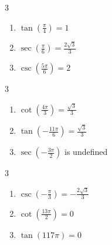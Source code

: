 \documentclass{ximera}
\begin{document}
	\author{Stitz-Zeager}


\begin{multicols}{3}

\begin{enumerate}

\item $\tan \left( \frac{\pi}{4} \right) = 1$ 
\item $\sec \left( \frac{\pi}{6} \right) = \frac{2\sqrt{3}}{3}$
\item $\csc \left( \frac{5\pi}{6} \right) = 2$ 

\setcounter{HW}{\value{enumi}}

\end{enumerate}

\end{multicols}

\begin{multicols}{3}

\begin{enumerate}

\setcounter{enumi}{\value{HW}}

\item $\cot \left( \frac{4\pi}{3} \right) = \frac{\sqrt{3}}{3}$
\item $\tan \left( -\frac{11\pi}{6} \right) = \frac{\sqrt{3}}{3}$
\item $\sec \left( -\frac{3\pi}{2} \right)$ is undefined 

\setcounter{HW}{\value{enumi}}

\end{enumerate}

\end{multicols}

\begin{multicols}{3}

\begin{enumerate}

\setcounter{enumi}{\value{HW}}

\item $\csc \left( -\frac{\pi}{3} \right) = -\frac{2\sqrt{3}}{3}$
\item $\cot \left( \frac{13\pi}{2} \right) = 0$
\item $\tan \left( 117\pi \right) = 0$ 

\setcounter{HW}{\value{enumi}}

\end{enumerate}

\end{multicols}
\end{document}
